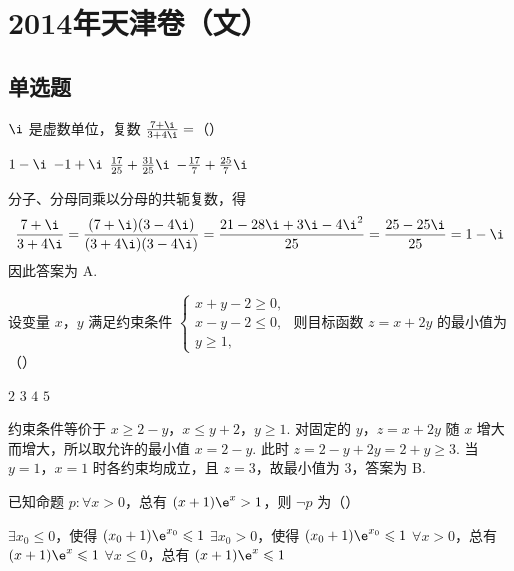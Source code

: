 \chapter{2014年天津卷（文）}

\section{单选题}

\begin{problem}
\(\i\) 是虚数单位，复数 \(\frac{7 + \i}{3 + 4\i} =\)（\quad）

\choices
    {\(1 - \i\)}
    {\(-1 + \i\)}
    {\(\frac{17}{25} + \frac{31}{25}\i\)}
    {\(-\frac{17}{7} + \frac{25}{7}\i\)}
\end{problem}


\begin{solution}
分子、分母同乘以分母的共轭复数，得
\[
\frac{7+\i}{3+4\i}=\frac{(7+\i)(3-4\i)}{(3+4\i)(3-4\i)}=\frac{21-28\i+3\i-4\i^{2}}{25}=\frac{25-25\i}{25}=1-\i
\]
因此答案为 A.
\end{solution}

\begin{problem}
设变量 \(x\)，\(y\) 满足约束条件 \(\begin{cases}
x + y - 2 \geqslant 0,\\
x - y - 2 \leqslant 0,\\
y \geqslant 1,
\end{cases}\) 则目标函数 \(z = x + 2y\) 的最小值为（\quad）

\choices
    {\(2\)}
    {\(3\)}
    {\(4\)}
    {\(5\)}
\end{problem}


\begin{solution}
约束条件等价于 \(x\geqslant2-y\)，\(x\leqslant y+2\)，\(y\geqslant1\). 对固定的 \(y\)，\(z=x+2y\) 随 \(x\) 增大而增大，所以取允许的最小值 \(x=2-y\). 此时 \(z=2-y+2y=2+y\geqslant3\). 当 \(y=1\)，\(x=1\) 时各约束均成立，且 \(z=3\)，故最小值为 \(3\)，答案为 B.
\end{solution}

\begin{problem}
已知命题 \( p: \forall x > 0 \)，总有 \( (x + 1)\e^x > 1 \)，则 \( \neg p \) 为（\quad）

\choices
    {\(\exists x_0 \leqslant 0\)，使得 \((x_0 + 1)\e^{x_0} \leqslant 1\)}
    {\(\exists x_0 > 0\)，使得 \((x_0 + 1)\e^{x_0} \leqslant 1\)}
    {\(\forall x > 0\)，总有 \((x + 1)\e^{x} \leqslant 1\)}
    {\(\forall x \leqslant 0\)，总有 \((x + 1)\e^{x} \leqslant 1\)}
\end{problem}

